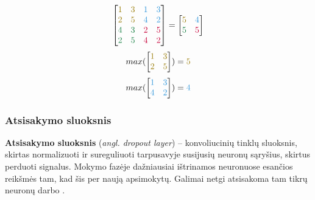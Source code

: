 \documentclass{VUMIFPSbakalaurinis}
\begin{document}
\begin{equation}\label{eq:poll}\def\y{\color{myyellow}}\def\b{\color{myblue}}\def\r{\color{myred}}\def\g{\color{mygreen}}
\begin{bmatrix}
\y{1} & \y{3} & \b{1} & \b{3} \\
\y{2} & \y{5} & \b{4} & \b{2} \\
\g{4} & \g{3} & \r{2} & \r{5} \\
\g{2} & \g{5} & \r{4} & \r{2} \\
\end{bmatrix}
= 
\begin{bmatrix}
\y{5} & \b{4} \\
\g{5} & \r{5} 
\end{bmatrix}
\end{equation}
\begin{equation}\label{eq:poll1}
max(
\begin{bmatrix}
\textcolor{myyellow}{1} & \textcolor{myyellow}{3} \\
\textcolor{myyellow}{2} & \textcolor{myyellow}{5}
\end{bmatrix}
) = \textcolor{myyellow}{5}
\end{equation}
\begin{equation}\label{eq:poll2}
max(
\begin{bmatrix}
\textcolor{myblue}{1} & \textcolor{myblue}{3} \\
\textcolor{myblue}{4} & \textcolor{myblue}{2} 
\end{bmatrix}
) = \textcolor{myblue}{4}
\end{equation}

\subsubsection{Atsisakymo sluoksnis}
\textbf{Atsisakymo sluoksnis} (\textit{angl. dropout layer}) – konvoliucinių tinklų sluoksnis, skirtas normalizuoti ir sureguliuoti tarpusavyje susijusių neuronų sąryšius, skirtus perduoti signalus. Mokymo fazėje dažniausiai ištrinamos neuronuose esančios reikšmės tam, kad šis per naują apsimokytų. Galimai netgi atsisakoma tam tikrų neuronų darbo \cite{DBLP:journals/corr/abs-1207-0580}.
\end{document}
